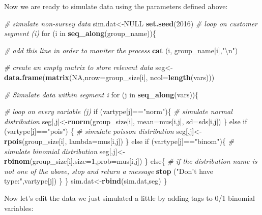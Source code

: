 \documentclass[]{book}
\newenvironment{Shaded}{\begin{snugshade}}{\end{snugshade}}
\newcommand{\KeywordTok}[1]{\textcolor[rgb]{0.13,0.29,0.53}{\textbf{{#1}}}}
\newcommand{\DataTypeTok}[1]{\textcolor[rgb]{0.13,0.29,0.53}{{#1}}}
\newcommand{\DecValTok}[1]{\textcolor[rgb]{0.00,0.00,0.81}{{#1}}}
\newcommand{\CharTok}[1]{\textcolor[rgb]{0.31,0.60,0.02}{{#1}}}
\newcommand{\StringTok}[1]{\textcolor[rgb]{0.31,0.60,0.02}{{#1}}}
\newcommand{\CommentTok}[1]{\textcolor[rgb]{0.56,0.35,0.01}{\textit{{#1}}}}
\newcommand{\OtherTok}[1]{\textcolor[rgb]{0.56,0.35,0.01}{{#1}}}
\newcommand{\NormalTok}[1]{{#1}}
\theoremstyle{definition}
\theoremstyle{definition}
\theoremstyle{remark}
\begin{document}
Now we are ready to simulate data using the parameters defined above:

\begin{Shaded}
\begin{Highlighting}[]
\CommentTok{# simulate non-survey data}
\NormalTok{sim.dat<-}\OtherTok{NULL}
\KeywordTok{set.seed}\NormalTok{(}\DecValTok{2016}\NormalTok{)}
\CommentTok{# loop on customer segment (i)}
 \NormalTok{for (i in }\KeywordTok{seq_along}\NormalTok{(group_name))\{}
 
   \CommentTok{# add this line in order to moniter the process}
   \KeywordTok{cat} \NormalTok{(i, group_name[i],}\StringTok{"}\CharTok{\textbackslash{}n}\StringTok{"}\NormalTok{)}
 
  \CommentTok{# create an empty matrix to store relevent data}
  \NormalTok{seg<-}\KeywordTok{data.frame}\NormalTok{(}\KeywordTok{matrix}\NormalTok{(}\OtherTok{NA}\NormalTok{,}\DataTypeTok{nrow=}\NormalTok{group_size[i], }\DataTypeTok{ncol=}\KeywordTok{length}\NormalTok{(vars)))  }
 
  \CommentTok{# Simulate data within segment i}
  \NormalTok{for (j in }\KeywordTok{seq_along}\NormalTok{(vars))\{}
 
    \CommentTok{# loop on every variable (j)}
    \NormalTok{if (vartype[j]==}\StringTok{"norm"}\NormalTok{)\{}
      \CommentTok{# simulate normal distribution}
      \NormalTok{seg[,j]<-}\KeywordTok{rnorm}\NormalTok{(group_size[i], }\DataTypeTok{mean=}\NormalTok{mus[i,j], }\DataTypeTok{sd=}\NormalTok{sds[i,j])}
    \NormalTok{\} else if (vartype[j]==}\StringTok{"pois"}\NormalTok{) \{}
      \CommentTok{# simulate poisson distribution}
      \NormalTok{seg[,j]<-}\KeywordTok{rpois}\NormalTok{(group_size[i], }\DataTypeTok{lambda=}\NormalTok{mus[i,j])}
    \NormalTok{\} else if (vartype[j]==}\StringTok{"binom"}\NormalTok{)\{}
      \CommentTok{# simulate binomial distribution}
      \NormalTok{seg[,j]<-}\KeywordTok{rbinom}\NormalTok{(group_size[i],}\DataTypeTok{size=}\DecValTok{1}\NormalTok{,}\DataTypeTok{prob=}\NormalTok{mus[i,j])}
    \NormalTok{\} else\{}
      \CommentTok{# if the distribution name is not one of the above, stop and return a message}
      \KeywordTok{stop} \NormalTok{(}\StringTok{"Don't have type:"}\NormalTok{,vartype[j])}
    \NormalTok{\}        }
  \NormalTok{\}}
  \NormalTok{sim.dat<-}\KeywordTok{rbind}\NormalTok{(sim.dat,seg)}
 \NormalTok{\}}
\end{Highlighting}
\end{Shaded}

Now let's edit the data we just simulated a little by adding tags to 0/1
binomial variables:
\end{document}
